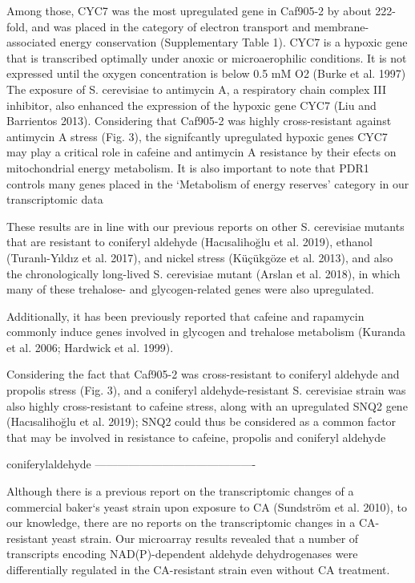 Among those, CYC7 was the most upregulated gene in Caf905-2 by about 222-fold, and was placed in the category of electron transport and membrane-associated energy conservation (Supplementary Table 1). CYC7 is a hypoxic gene that is transcribed optimally under anoxic or microaerophilic conditions. It is not expressed until the oxygen concentration is below 0.5 mM O2 (Burke et al. 1997) The exposure of S. cerevisiae to antimycin A, a respiratory chain complex III inhibitor, also enhanced the expression of the hypoxic gene CYC7 (Liu and Barrientos 2013). Considering that Caf905-2 was highly cross-resistant against antimycin A stress (Fig. 3), the signifcantly upregulated hypoxic genes CYC7 may play a critical role in cafeine and antimycin A resistance by their efects on mitochondrial energy metabolism. It is also important to note that PDR1 controls many genes placed in the ‘Metabolism of energy reserves’ category in our transcriptomic data

These results are in line with our previous reports on other S. cerevisiae mutants that are resistant to coniferyl aldehyde (Hacısalihoğlu et al. 2019), ethanol (Turanlı-Yıldız et al. 2017), and nickel stress (Küçükgöze et al. 2013), and also the chronologically long-lived S. cerevisiae mutant (Arslan et al. 2018), in which many of these trehalose- and glycogen-related genes were also upregulated.

Additionally, it has been previously reported that cafeine and rapamycin commonly induce genes involved in glycogen and trehalose metabolism (Kuranda et al. 2006; Hardwick et al. 1999).

Considering the fact that Caf905-2 was cross-resistant to coniferyl aldehyde and propolis stress (Fig. 3), and a coniferyl aldehyde-resistant S. cerevisiae strain was also highly cross-resistant to cafeine stress, along with an upregulated SNQ2 gene (Hacısalihoğlu et al. 2019); SNQ2 could thus be considered as a common factor that may be involved in resistance to cafeine, propolis and coniferyl aldehyde


 coniferylaldehyde
-------------------------------------------

Although there is a previous report on the transcriptomic changes of a commercial
baker‘s yeast strain upon exposure to CA (Sundström et al. 2010), to our knowledge, there are
no reports on the transcriptomic changes in a CA-resistant yeast strain. Our microarray results
revealed that a number of transcripts encoding NAD(P)-dependent aldehyde dehydrogenases
were differentially regulated in the CA-resistant strain even without CA treatment.

